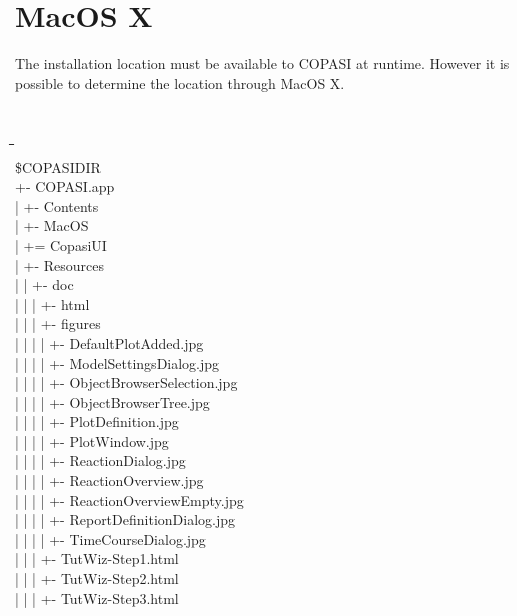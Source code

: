 \documentclass[12pt]{book}
\begin{document}
\section{MacOS X}
The installation location must be available to COPASI at
runtime. However it is possible to determine the location through MacOS
X.
{\tt \scriptsize
\begin{tabbing}
 \hspace{4 pt}\=\hspace{17 pt}\=\hspace{17 pt}\=\hspace{17
 pt}\=\hspace{17 pt}\=\hspace{17 pt}\= \\ [-12 pt]
 \$COPASIDIR \\
 \> +- COPASI.app \\
 \> | \> +- Contents \\
 \> | \> +- MacOS \\
 \> | \> += CopasiUI \\
 \> | \> +- Resources \\
 \> | \> | \> +- doc \\
 \> | \> | \> | \> +- html \\
 \> | \> | \> | \> \> +- figures \\
 \> | \> | \> | \> \> | \> +- DefaultPlotAdded.jpg \\
 \> | \> | \> | \> \> | \> +- ModelSettingsDialog.jpg \\
 \> | \> | \> | \> \> | \> +- ObjectBrowserSelection.jpg \\
 \> | \> | \> | \> \> | \> +- ObjectBrowserTree.jpg \\
 \> | \> | \> | \> \> | \> +- PlotDefinition.jpg \\
 \> | \> | \> | \> \> | \> +- PlotWindow.jpg \\
 \> | \> | \> | \> \> | \> +- ReactionDialog.jpg \\
 \> | \> | \> | \> \> | \> +- ReactionOverview.jpg \\
 \> | \> | \> | \> \> | \> +- ReactionOverviewEmpty.jpg \\
 \> | \> | \> | \> \> | \> +- ReportDefinitionDialog.jpg \\
 \> | \> | \> | \> \> | \> +- TimeCourseDialog.jpg \\
 \> | \> | \> | \> \> +- TutWiz-Step1.html \\
 \> | \> | \> | \> \> +- TutWiz-Step2.html \\
 \> | \> | \> | \> \> +- TutWiz-Step3.html \\

\end{tabbing}}
\end{document}
